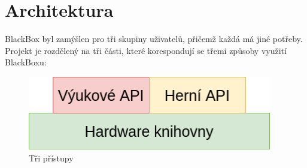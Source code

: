 \chapter{Architektura}

BlackBox byl zamýšlen pro tři skupiny uživatelů, přičemž každá má jiné potřeby.
Projekt je rozdělený na tři části, které korespondují se třemi způsoby využití BlackBoxu:

\begin{figure}[h]
    \begin{small}
        \begin{center}
            \includegraphics[width=0.95\textwidth]{img/Pyramida2.png}
        \end{center}
        \caption{Tři přístupy}
        \label{fig:Pyramida2}
    \end{small}
\end{figure}

    

